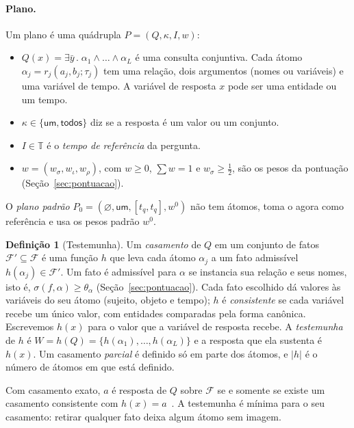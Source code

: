 \documentclass[11pt]{article}
\theoremstyle{definition}
\newtheorem{definicao}{Definição}
\theoremstyle{plain}
\newcommand{\F}{\mathcal{F}}          %
\newcommand{\T}{\mathbb{T}}           %
\newcommand{\um}{\textsf{um}}
\newcommand{\todos}{\textsf{todos}}
\begin{document}
\paragraph{Plano.}
Um plano é uma quádrupla $P=(Q,\kappa,I,w)$:
\begin{itemize}[leftmargin=*,itemsep=1pt]
\item $Q(x)=\exists\bar y\,.\;\alpha_1\wedge\dots\wedge\alpha_L$ é uma consulta
  conjuntiva. Cada átomo $\alpha_j=r_j(a_j,b_j;\tau_j)$ tem uma relação, dois
  argumentos (nomes ou variáveis) e uma variável de tempo. A variável de
  resposta $x$ pode ser uma entidade ou um tempo.
\item $\kappa\in\{\um,\todos\}$ diz se a resposta é um valor ou um conjunto.
\item $I\in\T$ é o \emph{tempo de referência} da pergunta.
\item $w=(w_\sigma,w_\iota,w_\rho)$, com $w\ge 0$, $\sum w=1$ e
  $w_\sigma\ge\tfrac12$, são os pesos da pontuação (Seção~\ref{sec:pontuacao}).
\end{itemize}
O \emph{plano padrão} $P_0=(\varnothing,\um,[t_q,t_q],w^0)$ não tem átomos,
toma o agora como referência e usa os pesos padrão $w^0$.

\begin{definicao}[Testemunha]
Um \emph{casamento} de $Q$ em um conjunto de fatos $\F'\subseteq\F$ é uma
função $h$ que leva cada átomo $\alpha_j$ a um fato admissível
$h(\alpha_j)\in\F'$. Um fato é admissível para $\alpha$ se instancia sua
relação e seus nomes, isto é, $\sigma(f,\alpha)\ge\theta_\alpha$
(Seção~\ref{sec:pontuacao}). Cada fato escolhido dá valores às variáveis do
seu átomo (sujeito, objeto e tempo); $h$ é \emph{consistente} se cada variável
recebe um único valor, com entidades comparadas pela forma canônica. Escrevemos
$h(x)$ para o valor que a variável de resposta recebe. A \emph{testemunha} de
$h$ é $W=h(Q)=\{h(\alpha_1),\dots,h(\alpha_L)\}$ e a resposta que ela sustenta
é $h(x)$. Um casamento \emph{parcial} é definido só em parte dos átomos, e
$|h|$ é o número de átomos em que está definido.
\end{definicao}

Com casamento exato, $a$ é resposta de $Q$ sobre $\F$ se e somente se existe
um casamento consistente com $h(x)=a$~\citep{chandra1977conjunctive}. A
testemunha é mínima para o seu casamento: retirar qualquer fato deixa algum
átomo sem imagem.
\end{document}
